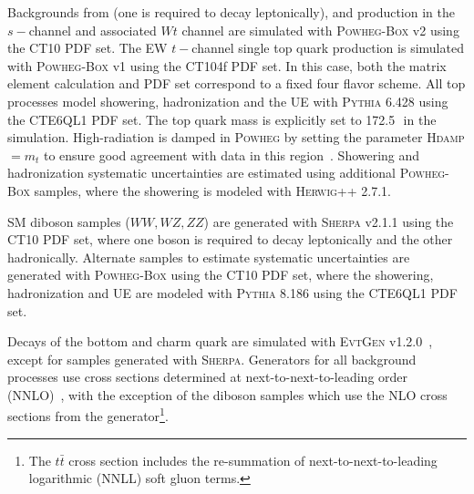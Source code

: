 Backgrounds from \ttbar (one is required to decay leptonically), and \Singlet production in the $s-$channel and associated $Wt$ channel are simulated with \textsc{Powheg-Box} v2 using the \textsc{CT10} PDF set. The EW $t-$channel single top quark production is simulated with \textsc{Powheg-Box} v1 using the  \textsc{CT10}4f PDF set. In this case, both the matrix element calculation and PDF set correspond to a fixed four flavor scheme. All top processes model showering, hadronization and the UE with \textsc{Pythia} 6.428 using the \textsc{CTE6QL1} PDF set. The top quark mass is explicitly set to 172.5\,\GeV\, in the simulation. High-\pt radiation is damped in \textsc{Powheg} by setting the parameter \textsc{Hdamp}$=m_t$ to ensure good agreement with data in this region~\cite{hdamp}. Showering and hadronization systematic uncertainties are estimated using additional \textsc{Powheg-Box} samples, where the showering is modeled with \textsc{Herwig++} 2.7.1.

SM diboson samples ($WW, WZ, ZZ$) are generated with \textsc{Sherpa} v2.1.1 using the \textsc{CT10} PDF set, where one boson is required to decay leptonically and the other hadronically. Alternate samples to estimate systematic uncertainties are generated with \textsc{Powheg-Box} using the \textsc{CT10} PDF set, where the showering, hadronization and UE are modeled with \textsc{Pythia} 8.186 using the \textsc{CTE6QL1} PDF set.

Decays of the bottom and charm quark are simulated with \textsc{EvtGen} v1.2.0~\cite{evtgen}, except for samples generated with \textsc{Sherpa}.
Generators for all background processes use cross sections determined at next-to-next-to-leading order (NNLO)~\cite{single_diboson, rapidity_nnlo, ttbar_nnlo, top_pp_nnlo, singletop_nnll, singletop_twoloop}, with the exception of the diboson samples which use the NLO cross sections from the generator\footnote{
The $t\bar{t}$ cross section includes the re-summation of next-to-next-to-leading logarithmic (NNLL) soft gluon terms.
}. 

